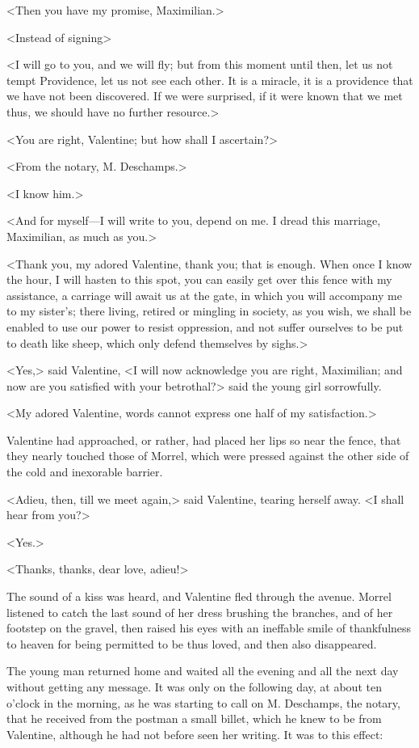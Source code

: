  <Then you have my promise, Maximilian.> 

 <Instead of signing\longdash> 

 <I will go to you, and we will fly; but from this moment until then, let us not tempt Providence, let us not see each other. It is a miracle, it is a providence that we have not been discovered. If we were surprised, if it were known that we met thus, we should have no further resource.> 

 <You are right, Valentine; but how shall I ascertain?> 

 <From the notary, M. Deschamps.> 

 <I know him.> 

 <And for myself—I will write to you, depend on me. I dread this marriage, Maximilian, as much as you.> 

 <Thank you, my adored Valentine, thank you; that is enough. When once I know the hour, I will hasten to this spot, you can easily get over this fence with my assistance, a carriage will await us at the gate, in which you will accompany me to my sister's; there living, retired or mingling in society, as you wish, we shall be enabled to use our power to resist oppression, and not suffer ourselves to be put to death like sheep, which only defend themselves by sighs.> 

 <Yes,> said Valentine, <I will now acknowledge you are right, Maximilian; and now are you satisfied with your betrothal?> said the young girl sorrowfully. 

 <My adored Valentine, words cannot express one half of my satisfaction.> 

 Valentine had approached, or rather, had placed her lips so near the fence, that they nearly touched those of Morrel, which were pressed against the other side of the cold and inexorable barrier. 

 <Adieu, then, till we meet again,> said Valentine, tearing herself away. <I shall hear from you?> 

 <Yes.> 

 <Thanks, thanks, dear love, adieu!> 

 The sound of a kiss was heard, and Valentine fled through the avenue. Morrel listened to catch the last sound of her dress brushing the branches, and of her footstep on the gravel, then raised his eyes with an ineffable smile of thankfulness to heaven for being permitted to be thus loved, and then also disappeared. 

 The young man returned home and waited all the evening and all the next day without getting any message. It was only on the following day, at about ten o'clock in the morning, as he was starting to call on M. Deschamps, the notary, that he received from the postman a small billet, which he knew to be from Valentine, although he had not before seen her writing. It was to this effect: 

